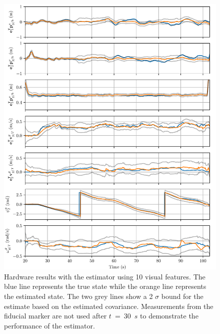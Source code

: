 \begin{figure}
  \centering
  \includegraphics[width=6.5in]{plots/hardware_results}
  \caption[Estimated State of the Target Landing Vehicle During Flight
  Experiments]{Hardware results with the estimator using 10 visual
  features. The blue line represents the true state while the orange line
  represents the estimated state. The two grey lines show a 2 $\sigma$ bound for
  the estimate based on the estimated covariance. Measurements from the fiducial
  marker are not used after $t$~=~30~$s$ to demonstrate the performance of the estimator.}
  \label{fig:est_hardware}
\end{figure}
